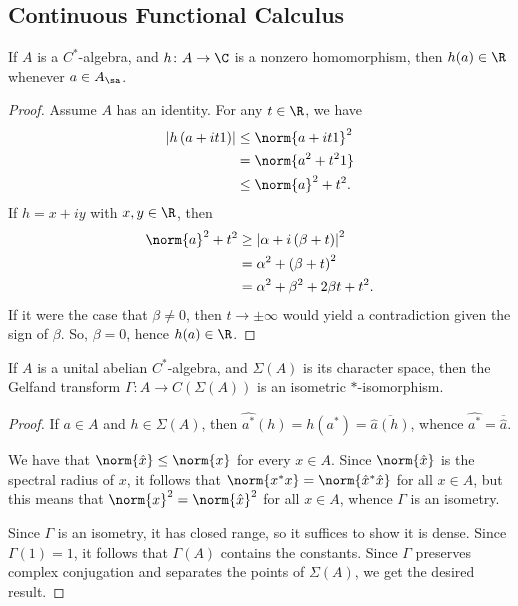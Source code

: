 \documentclass[10pt]{mypackage}
\begin{document}
\subsection{Continuous Functional Calculus}%
\begin{proposition}
  If $A$ is a $C^{\ast}$-algebra, and $h\colon A\to \C$ is a nonzero homomorphism, then $h(a)\in \R$ whenever $a\in A_{\sa}$.
\end{proposition}
\begin{proof}
  Assume $A$ has an identity. For any $t\in \R$, we have
  \begin{align*}
    \left\vert h\left( a + it1 \right) \right\vert &\leq \norm{a + it1}^2\\
                                                  &= \norm{a^2 + t^21}\\
                                                  &\leq \norm{a}^2 + t^2.
  \end{align*}
  If $h = x + iy$ with $x,y\in \R$, then
  \begin{align*}
    \norm{a}^2 + t^2 &\geq \left\vert \alpha + i\left( \beta + t \right) \right\vert^2\\
                     &= \alpha^2 + \left( \beta + t \right)^2\\
                     &= \alpha^2 + \beta^2 + 2\beta t + t^2.
  \end{align*}
  If it were the case that $\beta\neq 0$, then $t\to \pm \infty$ would yield a contradiction given the sign of $\beta$. So, $\beta = 0$, hence $h(a)\in \R$.
\end{proof}
\begin{theorem}
  If $A$ is a unital abelian $C^{\ast}$-algebra, and $\Sigma\left( A \right)$ is its character space, then the Gelfand transform $\Gamma\colon A\to C\left( \Sigma(A) \right)$ is an isometric $\ast$-isomorphism.
\end{theorem}
\begin{proof}
If $a\in A$ and $h\in \Sigma(A)$, then $\widehat{a^{\ast}}\left( h \right) = h\left( a^{\ast} \right) = \overline{\hat{a}(h)}$, whence $\widehat{a^{\ast}} = \overline{\hat{a}}$.

  We have that $\norm{\hat{x}}\leq \norm{x}$ for every $x\in A$. Since $\norm{\hat{x}}$ is the spectral radius of $x$, it follows that $\norm{x^{\ast}x} = \norm{\hat{x}^{\ast}\hat{x}}$ for all $x\in A$, but this means that $\norm{x}^2 = \norm{\hat{x}}^2$ for all $x\in A$, whence $\Gamma$ is an isometry.

  Since $\Gamma$ is an isometry, it has closed range, so it suffices to show it is dense. Since $\Gamma(1) = 1$, it follows that $\Gamma(A)$ contains the constants. Since $\Gamma$ preserves complex conjugation and separates the points of $\Sigma(A)$, we get the desired result.
\end{proof}
\end{document}
